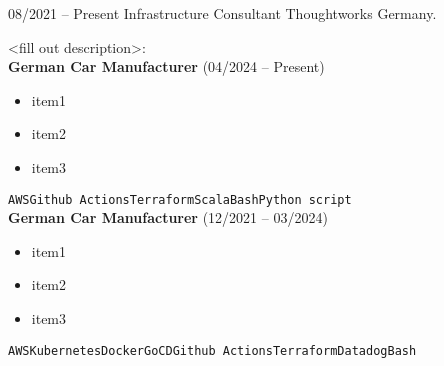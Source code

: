 \documentclass[9pt]{developercv} %
\begin{document}

	

    \begin{entrylist}
    	\entry
    		{08/2021 -- Present}
    		{Infrastructure Consultant}
    		{Thoughtworks Germany.}
    		{<fill out description>:\\

            \textbf{German Car Manufacturer} {\footnotesize(04/2024 -- Present)}
            \begin{itemize}
                \item item1
                \item item2
                \item item3

            \end{itemize}
      \texttt{AWS}\slashsep\texttt{Github Actions}\slashsep\texttt{Terraform}\slashsep\texttt{Scala}\slashsep\texttt{Bash}\slashsep\texttt{Python script}\\

            \textbf{German Car Manufacturer} {\footnotesize(12/2021 -- 03/2024)}
            \begin{itemize}
                \item item1
                \item item2
                \item item3
            \end{itemize}
      \texttt{AWS}\slashsep\texttt{Kubernetes}\slashsep\texttt{Docker}\slashsep\texttt{GoCD}\slashsep\texttt{Github Actions}\slashsep\texttt{Terraform}\slashsep\texttt{Datadog}\slashsep\texttt{Bash}

}
\end{entrylist}
\end{document}
